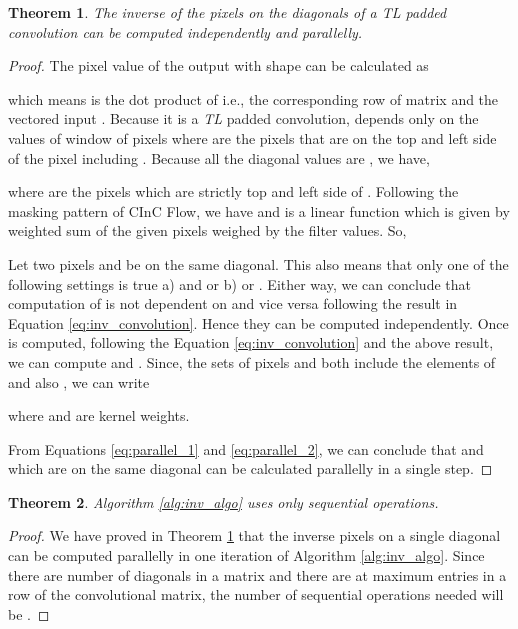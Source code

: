 \documentclass[a4paper,twoside]{article}
\newtheorem{theorem}{Theorem}
\theoremstyle{definition}
\begin{document}
\begin{theorem}
\label{th:ind_parallel}
The inverse of the pixels on the diagonals of a TL padded convolution can be computed independently and parallelly.
\end{theorem}
\begin{proof}
The  pixel value of the output  with shape  can be calculated as 
 
which means  is the dot product of  i.e., the corresponding row of matrix  and the vectored input .
Because it is a \emph{TL} padded convolution,  depends only on the values of  window of  pixels where  are the pixels that are on the top and left side of the pixel  including . Because all the diagonal values are , we have, 


where  are the pixels which are strictly top and left side of . Following the masking pattern of CInC Flow, we have  and  is a linear function which is given by weighted sum of the given pixels weighed by the filter values. So,



Let two pixels  and  be  on the same diagonal. This also means that only one of the following settings is true a)  and  or b)  or . Either way, we can conclude that computation of  is not dependent on  and vice versa following the result in Equation \ref{eq:inv_convolution}. Hence they can be computed independently.
Once  is computed, following the Equation \ref{eq:inv_convolution} and the above result, we can compute  and . Since, the sets of pixels  and  both include the elements of  and also , we can write


where  and  are kernel weights.

From Equations \ref{eq:parallel_1}  and \ref{eq:parallel_2}, we can conclude that  and  which are on the same diagonal can be calculated parallelly in a single step.
\end{proof}

\begin{theorem}
Algorithm \ref{alg:inv_algo} uses only  sequential operations.
\end{theorem}

\begin{proof}
We have proved in Theorem \ref{th:ind_parallel} that the inverse pixels on a single diagonal can be computed parallelly in one iteration of Algorithm \ref{alg:inv_algo}. Since there are  number of diagonals in a matrix and there are at maximum  entries in a row of the convolutional matrix, the number of sequential operations needed will be .
\end{proof}
\end{document}
